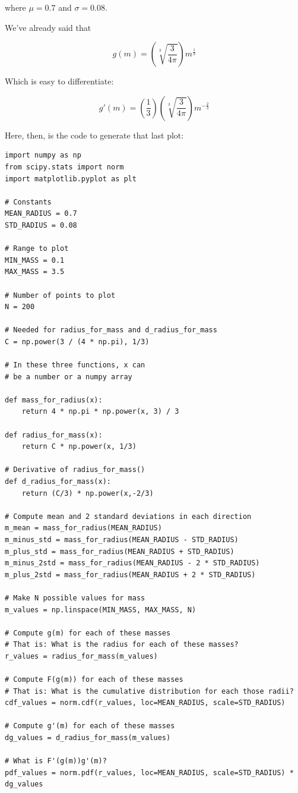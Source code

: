 where  $\mu = 0.7$ and $\sigma = 0.08$.

We've already said that 

$$g(m) = \left(\sqrt[3]{\frac{3}{4 \pi}}\right) m^{\frac{1}{3}}$$

Which is easy to differentiate:

$$g'(m) = \left(\frac{1}{3} \right) \left(\sqrt[3]{\frac{3}{4 \pi}}\right) m^{-\frac{2}{3}}$$

Here, then, is the code to generate that last plot:

\begin{verbatim}
import numpy as np
from scipy.stats import norm
import matplotlib.pyplot as plt

# Constants
MEAN_RADIUS = 0.7
STD_RADIUS = 0.08

# Range to plot
MIN_MASS = 0.1
MAX_MASS = 3.5

# Number of points to plot
N = 200

# Needed for radius_for_mass and d_radius_for_mass
C = np.power(3 / (4 * np.pi), 1/3)

# In these three functions, x can
# be a number or a numpy array

def mass_for_radius(x):
    return 4 * np.pi * np.power(x, 3) / 3

def radius_for_mass(x):
    return C * np.power(x, 1/3)

# Derivative of radius_for_mass()
def d_radius_for_mass(x):
    return (C/3) * np.power(x,-2/3)

# Compute mean and 2 standard deviations in each direction
m_mean = mass_for_radius(MEAN_RADIUS)
m_minus_std = mass_for_radius(MEAN_RADIUS - STD_RADIUS)
m_plus_std = mass_for_radius(MEAN_RADIUS + STD_RADIUS)
m_minus_2std = mass_for_radius(MEAN_RADIUS - 2 * STD_RADIUS)
m_plus_2std = mass_for_radius(MEAN_RADIUS + 2 * STD_RADIUS)

# Make N possible values for mass
m_values = np.linspace(MIN_MASS, MAX_MASS, N)

# Compute g(m) for each of these masses
# That is: What is the radius for each of these masses?
r_values = radius_for_mass(m_values)

# Compute F(g(m)) for each of these masses
# That is: What is the cumulative distribution for each those radii?
cdf_values = norm.cdf(r_values, loc=MEAN_RADIUS, scale=STD_RADIUS)

# Compute g'(m) for each of these masses
dg_values = d_radius_for_mass(m_values)

# What is F'(g(m))g'(m)?
pdf_values = norm.pdf(r_values, loc=MEAN_RADIUS, scale=STD_RADIUS) * dg_values


\end{verbatim}

